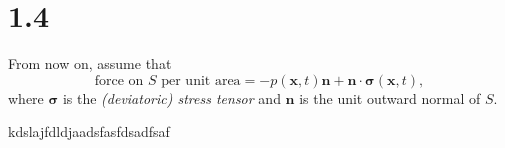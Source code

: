 \section{1.4}
\label{sec:1.4}

\begin{asm}
  \label{asm:surfaceForceViscous}
  From now on,
  assume that
  \begin{equation}
    \label{eq:surfaceForceSigma}
    \text{force on $S$ per unit area} = -p(\mathbf{x},t)\mathbf{n}+\mathbf{n}\cdot\boldsymbol\sigma(\mathbf{x},t),
  \end{equation}
  where $\boldsymbol\sigma$ is the \emph{(deviatoric) stress tensor} and
  $\mathbf{n}$ is the unit outward normal of $S$.
\end{asm}

kdslajfdldjaadsfasfdsadfsaf
